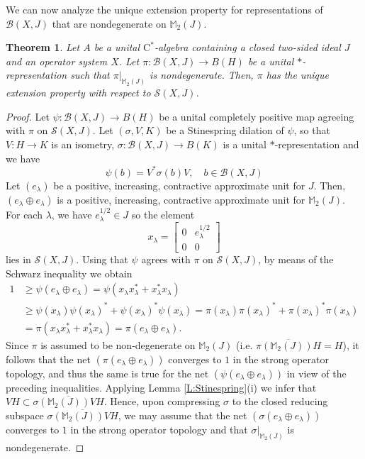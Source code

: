 \documentclass[10pt]{amsart}
\newcommand{\bM}{{\mathbb{M}}}
\newcommand{\B}{{\mathcal{B}}}
\renewcommand{\S}{{\mathcal{S}}}
\newcommand{\rC}{\mathrm{C}}
\newcommand{\ol}{\overline}
\newtheorem{theorem}[lemma]{Theorem}
\theoremstyle{definition}
\begin{document}
We can now analyze the unique extension property for representations of $\B(X,J)$ that are nondegenerate on $\bM_2(J)$.

\begin{theorem}\label{T:uepnondeg}
Let $A$ be a unital $\rC^*$-algebra containing a closed two-sided ideal $J$ and an operator system $X$.
Let $\pi:\B(X,J)\to B(H)$ be a unital  $*$-representation such that $\pi|_{\bM_2(J)}$ is nondegenerate. Then, $\pi$ has the unique extension property with respect to $\S(X,J)$.
\end{theorem}
\begin{proof}
Let $\psi:\B(X,J)\to B(H)$ be a unital completely positive map agreeing with $\pi$ on $\S(X,J)$. Let $(\sigma,V,K)$ be a Stinespring dilation of $\psi$, so that $V:H\to K$ is an isometry, $\sigma:\B(X,J)\to B(K)$ is a unital $*$-representation and we have
\[
\psi(b)=V^*\sigma(b)V, \quad b\in \B(X,J)
\]
Let $(e_\lambda)$ be a positive, increasing, contractive approximate unit for $J$. Then, $(e_\lambda\oplus e_\lambda)$ is  a positive, increasing, contractive approximate unit for $\bM_2(J)$. For each $\lambda$, we have $e_\lambda^{1/2}\in J$ so the element
\[
x_\lambda=\begin{bmatrix} 0 & e_\lambda^{1/2}\\ 0 & 0 \end{bmatrix}
\]
lies in $\S(X,J)$.
Using that $\psi$ agrees with $\pi$ on $\S(X,J)$, by means of the Schwarz inequality we obtain
\begin{align*}
1&\geq \psi(e_\lambda\oplus e_\lambda)=\psi(x_\lambda x_\lambda^*+x_\lambda^*x_\lambda)\\
&\geq \psi(x_\lambda)\psi(x_\lambda)^*+\psi(x_\lambda)^*\psi(x_\lambda)= \pi(x_\lambda)\pi(x_\lambda)^*+\pi(x_\lambda)^*\pi(x_\lambda)\\
&=\pi(x_\lambda x_\lambda^*+x_\lambda^*x_\lambda)=\pi(e_\lambda\oplus e_\lambda).
\end{align*}
Since $\pi$ is assumed to be non-degenerate on $\bM_2(J)$ (i.e. $\ol{\pi(\bM_2(J))H}=H$), it follows that the net $(\pi(e_\lambda\oplus e_\lambda))$ converges to $1$ in the strong operator topology, and thus the same is true for the net $ (\psi(e_\lambda\oplus e_\lambda))$ in view of the preceding inequalities. Applying Lemma \ref{L:Stinespring}(i) we infer that  $VH\subset \ol{\sigma(\bM_2(J))VH}$.  Hence, upon compressing $\sigma$ to the closed reducing subspace $\ol{\sigma(\bM_2(J))VH}$, we may assume  that the net $(\sigma(e_\lambda\oplus e_\lambda))$ converges to $1$ in the strong operator topology and that $\sigma|_{\bM_2(J)}$ is nondegenerate.


\end{proof}
\end{document}
